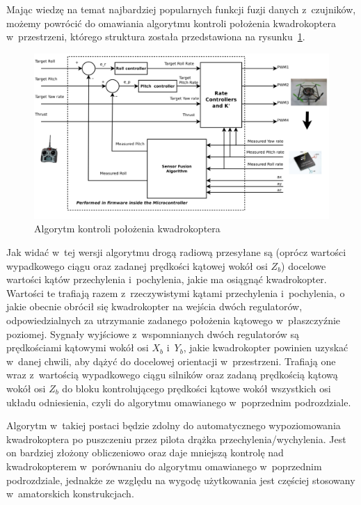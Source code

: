 \documentclass[11pt, twoside]{Thesis} %
\begin{document}
Mając wiedzę na temat najbardziej popularnych funkcji fuzji danych z~czujników, możemy powrócić do omawiania algorytmu kontroli położenia kwadrokoptera w~przestrzeni, którego struktura została przedstawiona na rysunku~\ref{fig:angle_control_algorithm}.

\begin{figure}[H]
	\centering
	\includegraphics[width=1.0\textwidth]{Pictures/angle_control_algorithm.png}
		\caption[Algorytm kontroli położenia kwadrokoptera]{Algorytm kontroli położenia kwadrokoptera~\cite{quadro9}}
	\label{fig:angle_control_algorithm}
\end{figure}

Jak widać w~tej wersji algorytmu drogą radiową przesyłane są (oprócz wartości wypadkowego ciągu oraz zadanej prędkości kątowej wokół osi $Z_b$) docelowe wartości kątów przechylenia i~pochylenia, jakie ma osiągnąć kwadrokopter. Wartości te trafiają razem z~rzeczywistymi kątami przechylenia i~pochylenia, o jakie obecnie obrócił się kwadrokopter na wejścia dwóch regulatorów, odpowiedzialnych za utrzymanie zadanego położenia kątowego w~płaszczyźnie poziomej. Sygnały wyjściowe z~wspomnianych dwóch regulatorów są prędkościami kątowymi wokół osi $X_b$ i~$Y_b$, jakie kwadrokopter powinien uzyskać w~danej chwili, aby dążyć do docelowej orientacji w~przestrzeni. Trafiają one wraz z~wartością wypadkowego ciągu silników oraz zadaną prędkością kątową wokół osi $Z_b$ do bloku kontrolującego prędkości kątowe wokół wszystkich osi układu odniesienia, czyli do algorytmu omawianego w~poprzednim podrozdziale. 

Algorytm w~takiej postaci będzie zdolny do automatycznego wypoziomowania kwadrokoptera po puszczeniu przez pilota drążka przechylenia/wychylenia. Jest on bardziej złożony obliczeniowo  oraz daje mniejszą kontrolę nad kwadrokopterem w~porównaniu do algorytmu omawianego w~poprzednim podrozdziale, jednakże ze względu na wygodę użytkowania jest częściej stosowany w~amatorskich konstrukcjach.
 
\end{document}
